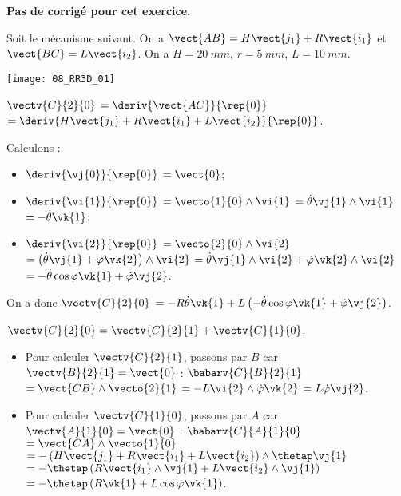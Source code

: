 \normalfalse \difficiletrue \tdifficilefalse
\correctiontrue


\setcounter{question}{0}
\ifcorrection
\else
\textbf{Pas de corrigé pour cet exercice.}
\fi

\ifprof
\else
Soit le mécanisme suivant. On a $\vect{AB}=H\vect{j_1}+R\vect{i_1}$ et $\vect{BC}=L\vect{i_2}$. On a $H=\SI{20}{mm}$, $r=\SI{5}{mm}$, $L=\SI{10}{mm}$. 
\begin{center}
\texttt{[image: 08\_RR3D\_01]}
\end{center}
\fi

\ifprof
$\vectv{C}{2}{0}$ 
$=\deriv{\vect{AC}}{\rep{0}}$
$=\deriv{H\vect{j_1}+R\vect{i_1}+L\vect{i_2}}{\rep{0}}$.

Calculons : 
\begin{itemize}
\item $\deriv{\vj{0}}{\rep{0}}$ $=\vect{0}$;
\item $\deriv{\vi{1}}{\rep{0}}$ $=\vecto{1}{0} \wedge \vi{1}$ $=\dot{\theta}\vj{1} \wedge \vi{1}$ $=-\dot{\theta}\vk{1}$;
\item $\deriv{\vi{2}}{\rep{0}}$ $=\vecto{2}{0} \wedge \vi{2}$ 
$=\left(\dot{\theta}\vj{1} + \dot{\varphi}\vk{2}\right)\wedge \vi{2}$
$=\dot{\theta}\vj{1}\wedge \vi{2} + \dot{\varphi}\vk{2}\wedge \vi{2}$
$=-\dot{\theta}\cos\varphi\vk{1} + \dot{\varphi}\vj{2}$.
\end{itemize}

On a donc 
$\vectv{C}{2}{0}$ 
$= -R\dot{\theta}\vk{1}+L\left(-\dot{\theta}\cos\varphi\vk{1} + \dot{\varphi}\vj{2}\right)$.


\else
\fi

\ifprof
$\vectv{C}{2}{0}=\vectv{C}{2}{1}+\vectv{C}{1}{0}$.

\begin{itemize}
\item Pour calculer $\vectv{C}{2}{1}$, passons par $B$ car $\vectv{B}{2}{1}=\vect{0}$ :
$\babarv{C}{B}{2}{1}$
$ = \vect{CB}\wedge\vecto{2}{1}$
$ = -L\vi{2}\wedge\dot{\varphi}\vk{2}$
$ = L\dot{\varphi}\vj{2}$.
\item Pour calculer $\vectv{C}{1}{0}$, passons par $A$ car $\vectv{A}{1}{0}=\vect{0}$ :
$\babarv{C}{A}{1}{0}$
$ = \vect{CA}\wedge\vecto{1}{0}$
$ = -\left( H\vect{j_1}+R\vect{i_1}+L\vect{i_2}\right)\wedge\thetap\vj{1}$
$ = -\thetap\left( R\vect{i_1}\wedge\vj{1}+L\vect{i_2}\wedge\vj{1}\right)$
$ = -\thetap\left( R\vk{1}+L\cos\varphi\vk{1}\right)$.
\end{itemize}

